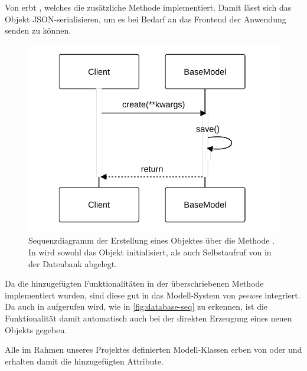 Von  erbt , welches die zusätzliche Methode  implementiert. Damit lässt sich das Objekt JSON-serialisieren, um es bei Bedarf an das Frontend der Anwendung senden zu können.

\begin{figure}[!ht]
	\centering
	\includegraphics[width=0.75\linewidth]{images/diagrams/database-seq.pdf}
	\caption{Sequenzdiagramm der Erstellung eines Objektes über die Methode . In  wird sowohl das Objekt initialisiert, als auch Selbstaufruf von  in der Datenbank abgelegt.}
	\label{fig:database-seq}
\end{figure}

Da die hinzugefügten Funktionalitäten in der überschriebenen Methode  implementiert wurden, sind diese gut in das Modell-System von \emph{peewee} integriert. Da  auch in  aufgerufen wird, wie in \autoref{fig:database-seq} zu erkennen, ist die Funktionalität damit automatisch auch bei der direkten Erzeugung eines neuen Objekts gegeben.

Alle im Rahmen unseres Projektes definierten Modell-Klassen erben von  oder  und erhalten damit die hinzugefügten Attribute.
